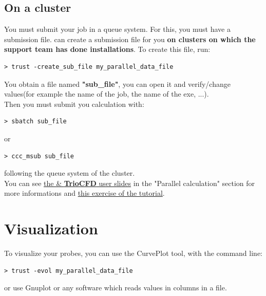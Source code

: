 \subsection{On a cluster}
You must submit your job in a queue system.
For this, you must have a submission file.
\trust can create a submission file for you \textbf{on clusters on which the support team has done installations}.
To create this file, run:
\begin{verbatim}
> trust -create_sub_file my_parallel_data_file
\end{verbatim}

You obtain a file named \textbf{"sub\_file"}, you can open it and verify/change values(for example the name of the job, the name of the exe, ...).\\

Then you must submit you calculation with:
\begin{verbatim}
> sbatch sub_file
\end{verbatim}
or 
\begin{verbatim}
> ccc_msub sub_file
\end{verbatim}
following the queue system of the cluster.\\


You can see \href{TRUST_and_TrioCFD_presentation.pdf}{the \trust \& \textbf{TrioCFD} user slides} in the "Parallel calculation" section for more informations and \href{TRUST_tutorial.pdf\#exo_para_3}{this exercise of the \trust tutorial}.


\section{Visualization}
To visualize your probes, you can use the CurvePlot tool, with the command line:
\begin{verbatim}
> trust -evol my_parallel_data_file
\end{verbatim}
or use Gnuplot or any software which reads values in columns in a file.\\

